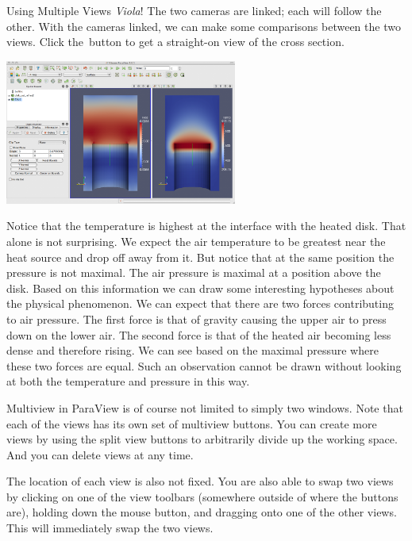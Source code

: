 \begin{exercise}{Using Multiple Views}
  \emph{Viola}!  The two cameras are linked; each will follow the other.
  With the cameras linked, we can make some comparisons between the two
  views.  Click the~\xPlus button to get a straight-on view of the cross
  section.

  \begin{inlinefig}
    \includegraphics[width=3in]{images/CameraLink}
  \end{inlinefig}

  Notice that the temperature is highest at the interface with the heated
  disk.  That alone is not surprising.  We expect the air temperature to be
  greatest near the heat source and drop off away from it.  But notice that
  at the same position the pressure is not maximal.  The air pressure is
  maximal at a position above the disk.  Based on this information we can
  draw some interesting hypotheses about the physical phenomenon.  We can
  expect that there are two forces contributing to air pressure.  The first
  force is that of gravity causing the upper air to press down on the lower
  air.  The second force is that of the heated air becoming less dense and
  therefore rising.  We can see based on the maximal pressure where these
  two forces are equal.  Such an observation cannot be drawn without
  looking at both the temperature and pressure in this way.
\end{exercise}

Multiview in ParaView is of course not limited to simply two windows.  Note
that each of the views has its own set of multiview buttons.  You can
create more views by using the split view buttons \splitViewH \splitViewV
to arbitrarily divide up the working space.  And you can delete views
\deleteView at any time.

The location of each view is also not fixed.  You are also able to swap two
views by clicking on one of the view toolbars (somewhere outside of where
the buttons are), holding down the mouse button, and dragging onto one of
the other views.  This will immediately swap the two views.

